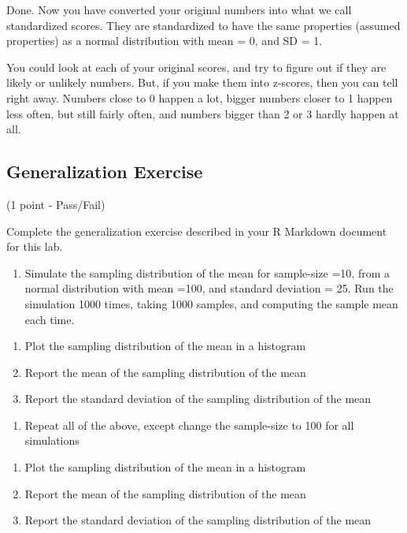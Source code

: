 \documentclass[
]{book}
\providecommand{\tightlist}{%
  \setlength{\itemsep}{0pt}\setlength{\parskip}{0pt}}
\begin{document}
Done. Now you have converted your original numbers into what we call standardized scores. They are standardized to have the same properties (assumed properties) as a normal distribution with mean = 0, and SD = 1.

You could look at each of your original scores, and try to figure out if they are likely or unlikely numbers. But, if you make them into z-scores, then you can tell right away. Numbers close to 0 happen a lot, bigger numbers closer to 1 happen less often, but still fairly often, and numbers bigger than 2 or 3 hardly happen at all.

\hypertarget{generalization-exercise-3}{%
\subsection{Generalization Exercise}\label{generalization-exercise-3}}

(1 point - Pass/Fail)

Complete the generalization exercise described in your R Markdown document for this lab.

\begin{enumerate}
\def\labelenumi{\arabic{enumi}.}
\tightlist
\item
  Simulate the sampling distribution of the mean for sample-size =10, from a normal distribution with mean =100, and standard deviation = 25. Run the simulation 1000 times, taking 1000 samples, and computing the sample mean each time.
\end{enumerate}

\begin{enumerate}
\def\labelenumi{\alph{enumi}.}
\tightlist
\item
  Plot the sampling distribution of the mean in a histogram
\item
  Report the mean of the sampling distribution of the mean
\item
  Report the standard deviation of the sampling distribution of the mean
\end{enumerate}

\begin{enumerate}
\def\labelenumi{\arabic{enumi}.}
\setcounter{enumi}{1}
\tightlist
\item
  Repeat all of the above, except change the sample-size to 100 for all simulations
\end{enumerate}

\begin{enumerate}
\def\labelenumi{\alph{enumi}.}
\tightlist
\item
  Plot the sampling distribution of the mean in a histogram
\item
  Report the mean of the sampling distribution of the mean
\item
  Report the standard deviation of the sampling distribution of the mean
\end{enumerate}
\end{document}
